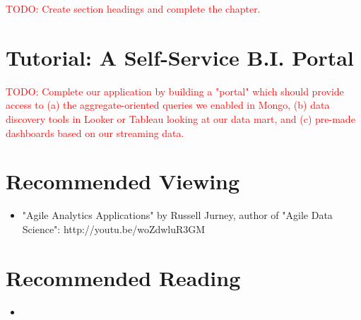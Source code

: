 \documentclass[11pt]{book}
\newcommand{\todo}[1]{\textcolor{red}{TODO: #1}} %
\begin{document}
\todo{Create section headings and complete the chapter.}

\section*{Tutorial: A Self-Service B.I. Portal}

\todo{Complete our application by building a "portal" which should provide access to (a) the aggregate-oriented queries we enabled in Mongo, (b) data discovery tools in Looker or Tableau looking at our data mart, and (c) pre-made dashboards based on our streaming data.}

\section*{Recommended Viewing}
\begin{itemize}
    \item "Agile Analytics Applications" by Russell Jurney, author of "Agile Data Science": http://youtu.be/woZdwluR3GM
\end{itemize}

\section*{Recommended Reading}
\begin{itemize}
    \item 
\end{itemize}













\end{document}
